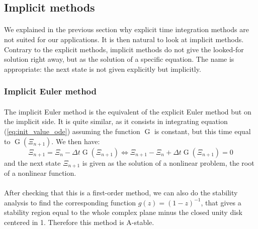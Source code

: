     \subsection{Implicit methods}

      \paragraph{}
      We explained in the previous section why explicit time integration methods are not suited for our applications.
      It is then natural to look at implicit methods.
      Contrary to the explicit methods, implicit methods do not give the looked-for solution right away, but as the solution of a specific equation.
      The name is appropriate: the next state is not given explicitly but implicitly.


      \subsubsection{Implicit Euler method}

        \paragraph{}
        The implicit Euler method is the equivalent of the explicit Euler method but on the implicit side.
        It is quite similar, as it consists in integrating equation (\ref{eq:init_value_ode}) assuming the function $\operatorname{G}$ is constant, but this time equal to $\operatorname{G}\left(\Xi_{n+1}\right)$.
        We then have:
        \begin{equation}
          \Xi_{n+1} = \Xi_n - \Delta t \operatorname{G}\left(\Xi_{n+1}\right)
          \Leftrightarrow \Xi_{n+1} - \Xi_n + \Delta t \operatorname{G}\left(\Xi_{n+1}\right) = 0
        \end{equation}
        and the next state $\Xi_{n+1}$ is given as the solution of a nonlinear problem, the root of a nonlinear function.

        \paragraph{}
        After checking that this is a first-order method, we can also do the stability analysis to find the corresponding function $g\left(z\right) = \left(1 - z\right)^{-1}$, that gives a stability region equal to the whole complex plane minus the closed unity disk centered in 1.
        Therefore this method is A-stable.


